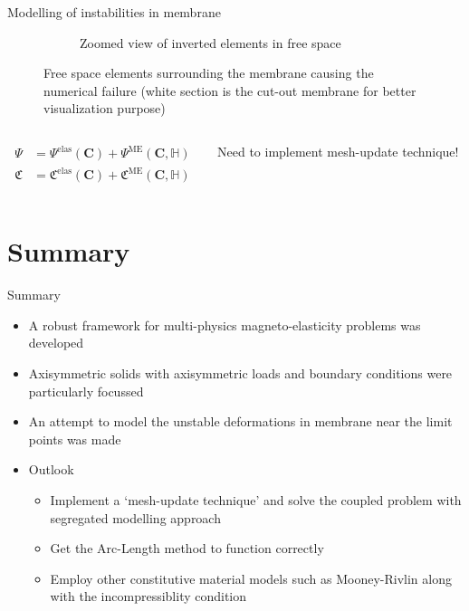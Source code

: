 \documentclass{beamer}
\begin{document}
\begin{frame}{Modelling of instabilities in membrane}
{\begin{figure}[h]
\begin{subfigure}{0.58\textwidth}
\caption{Zoomed view of inverted elements in free space}
\end{subfigure}
\caption{Free space elements surrounding the membrane causing the numerical failure (white section is the cut-out membrane for better visualization purpose)}
\end{figure}
\vspace{-3em}
\begin{columns}
\begin{column}{0.4\textwidth}
\begin{align*}
\Psi &= \Psi^{\text{elas}}(\mathbf{C}) + \Psi^{\text{ME}}(\mathbf{C},\mathbb{H}) \\
\mathfrak{C} &= \mathfrak{C}^{\text{elas}}(\mathbf{C}) + \mathfrak{C}^{\text{ME}}(\mathbf{C},\mathbb{H})
\end{align*}
\end{column}
\begin{column}{0.59\textwidth}
\begin{center}
\alert{Need to implement mesh-update technique!}
\end{center}
\end{column}
\end{columns}
}%
\end{frame}

\section*{Summary}

\begin{frame}{Summary}
  \begin{itemize}
  \item A robust framework for multi-physics magneto-elasticity problems was developed
  \item Axisymmetric solids with axisymmetric loads and boundary conditions were particularly focussed
  \item An attempt to model the unstable deformations in membrane near the limit points was made
  \end{itemize}
  
  \begin{itemize}
  \item
    Outlook
    \begin{itemize}
    \item Implement a `mesh-update technique' and solve the coupled problem with segregated modelling approach
    \item Get the Arc-Length method to function correctly
    \item Employ other constitutive material models such as Mooney-Rivlin along with the incompressiblity condition
    \end{itemize}
  \end{itemize}
\end{frame}
\end{document}
